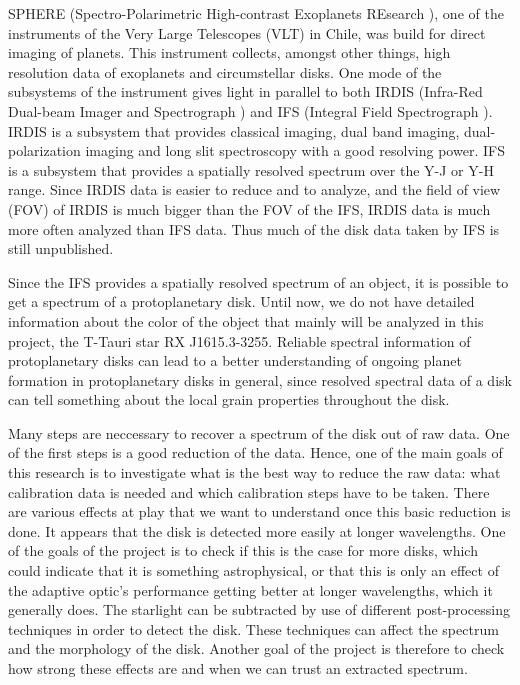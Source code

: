 \documentclass[twoside,single,12pt]{lion-msc}
\begin{document}
SPHERE (Spectro-Polarimetric High-contrast Exoplanets REsearch \citep{Beuzit2008}), one of the instruments of the Very Large Telescopes (VLT) in Chile, was build for direct imaging of planets. This instrument collects, amongst other things, high resolution data of exoplanets and circumstellar disks. One mode of the subsystems of the instrument gives light in parallel to both IRDIS (Infra-Red Dual-beam Imager and Spectrograph \cite{Dohlen2008}) and IFS (Integral Field Spectrograph \citep{Claudi2006}). IRDIS is a subsystem that provides classical imaging, dual band imaging, dual-polarization imaging and long slit spectroscopy with a good resolving power. IFS is a subsystem that provides a spatially resolved spectrum over the Y-J or Y-H range. Since IRDIS data is easier to reduce and to analyze, and the field of view (FOV) of IRDIS is much bigger than the FOV of the IFS, IRDIS data is much more often analyzed than IFS data. Thus much of the disk data taken by IFS is still unpublished.
\bigskip

Since the IFS provides a spatially resolved spectrum of an object, it is possible to get a spectrum of a protoplanetary disk. Until now, we do not have detailed information about the color of the object that mainly will be analyzed in this project, the T-Tauri star RX J1615.3-3255. Reliable spectral information of protoplanetary disks can lead to a better understanding of ongoing planet formation in protoplanetary disks in general, since resolved spectral data of a disk can tell something about the local grain properties throughout the disk.
\bigskip

Many steps are neccessary to recover a spectrum of the disk out of raw data. One of the first steps is a good reduction of the data. Hence, one of the main goals of this research is to investigate what is the best way to reduce the raw data: what calibration data is needed and which calibration steps have to be taken. There are various effects at play that we want to understand once this basic reduction is done. It appears that the disk is detected more easily at longer wavelengths. One of the goals of the project is to check if this is the case for more disks, which could indicate that it is something astrophysical, or that this is only an effect of the adaptive optic's performance getting better at longer wavelengths, which it generally does. The starlight can be subtracted by use of different post-processing techniques in order to detect the disk. These techniques can affect the spectrum and the morphology of the disk. Another goal of the project is therefore to check how strong these effects are and when we can trust an extracted spectrum.
\bigskip
\end{document}
